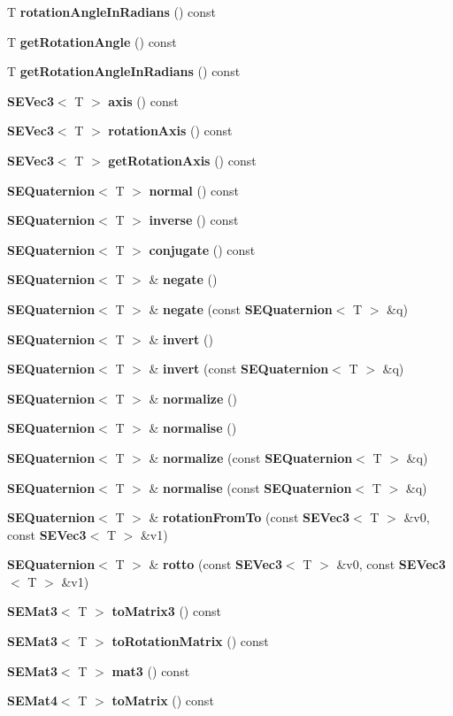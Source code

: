 \begin{DoxyCompactItemize}
\item 
T {\bf rotation\+Angle\+In\+Radians} () const 
\item 
T {\bf get\+Rotation\+Angle} () const 
\item 
T {\bf get\+Rotation\+Angle\+In\+Radians} () const 
\item 
{\bf S\+E\+Vec3}$<$ T $>$ {\bf axis} () const 
\item 
{\bf S\+E\+Vec3}$<$ T $>$ {\bf rotation\+Axis} () const 
\item 
{\bf S\+E\+Vec3}$<$ T $>$ {\bf get\+Rotation\+Axis} () const 
\item 
{\bf S\+E\+Quaternion}$<$ T $>$ {\bf normal} () const 
\item 
{\bf S\+E\+Quaternion}$<$ T $>$ {\bf inverse} () const 
\item 
{\bf S\+E\+Quaternion}$<$ T $>$ {\bf conjugate} () const 
\item 
{\bf S\+E\+Quaternion}$<$ T $>$ \& {\bf negate} ()
\item 
{\bf S\+E\+Quaternion}$<$ T $>$ \& {\bf negate} (const {\bf S\+E\+Quaternion}$<$ T $>$ \&q)
\item 
{\bf S\+E\+Quaternion}$<$ T $>$ \& {\bf invert} ()
\item 
{\bf S\+E\+Quaternion}$<$ T $>$ \& {\bf invert} (const {\bf S\+E\+Quaternion}$<$ T $>$ \&q)
\item 
{\bf S\+E\+Quaternion}$<$ T $>$ \& {\bf normalize} ()
\item 
{\bf S\+E\+Quaternion}$<$ T $>$ \& {\bf normalise} ()
\item 
{\bf S\+E\+Quaternion}$<$ T $>$ \& {\bf normalize} (const {\bf S\+E\+Quaternion}$<$ T $>$ \&q)
\item 
{\bf S\+E\+Quaternion}$<$ T $>$ \& {\bf normalise} (const {\bf S\+E\+Quaternion}$<$ T $>$ \&q)
\item 
{\bf S\+E\+Quaternion}$<$ T $>$ \& {\bf rotation\+From\+To} (const {\bf S\+E\+Vec3}$<$ T $>$ \&v0, const {\bf S\+E\+Vec3}$<$ T $>$ \&v1)
\item 
{\bf S\+E\+Quaternion}$<$ T $>$ \& {\bf rotto} (const {\bf S\+E\+Vec3}$<$ T $>$ \&v0, const {\bf S\+E\+Vec3}$<$ T $>$ \&v1)
\item 
{\bf S\+E\+Mat3}$<$ T $>$ {\bf to\+Matrix3} () const 
\item 
{\bf S\+E\+Mat3}$<$ T $>$ {\bf to\+Rotation\+Matrix} () const 
\item 
{\bf S\+E\+Mat3}$<$ T $>$ {\bf mat3} () const 
\item 
{\bf S\+E\+Mat4}$<$ T $>$ {\bf to\+Matrix} () const 

\end{DoxyCompactItemize}
